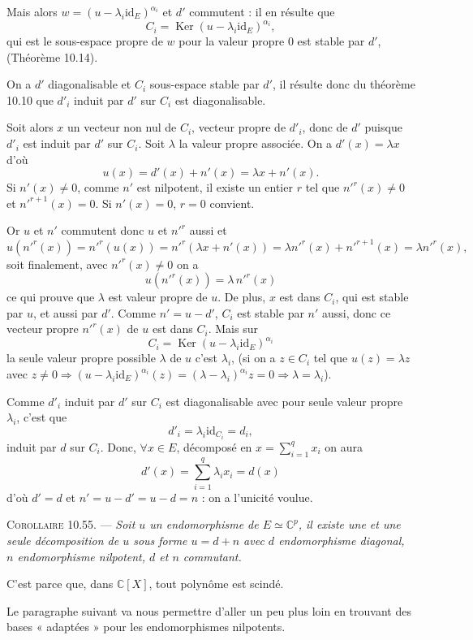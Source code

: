 Mais alors $w=(u-\lambda_i\mathrm{id}_E)^{\alpha_i}$ et $d'$ commutent : il en résulte que
\[
C_i=\operatorname{Ker}(u-\lambda_i\mathrm{id}_E)^{\alpha_i},
\]
qui est le sous-espace propre de $w$ pour la valeur propre 0 est stable par $d'$, (Théorème 10.14).

On a $d'$ diagonalisable et $C_i$ sous-espace stable par $d'$, il résulte donc du théorème 10.10 que $d'_i$ induit par $d'$ sur $C_i$ est diagonalisable.

Soit alors $x$ un vecteur non nul de $C_i$, vecteur propre de $d'_i$, donc de $d'$ puisque $d'_i$ est induit par $d'$ sur $C_i$. Soit $\lambda$ la valeur propre associée.
On a $d'(x)=\lambda x$ d'où
\[
u(x)=d'(x)+n'(x)=\lambda x+n'(x).
\]
Si $n'(x)\ne0$, comme $n'$ est nilpotent, il existe un entier $r$ tel que $n'^r(x)\ne0$ et $n'^{r+1}(x)=0$. Si $n'(x)=0$, $r=0$ convient.

Or $u$ et $n'$ commutent donc $u$ et $n'^r$ aussi et
\[
u(n'^r(x))=n'^r(u(x))=n'^r(\lambda x+n'(x))
=\lambda n'^r(x)+n'^{r+1}(x)=\lambda n'^r(x),
\]
soit finalement, avec $n'^r(x)\ne0$ on a
\[
u(n'^r(x))=\lambda\,n'^r(x)
\]
ce qui prouve que $\lambda$ est valeur propre de $u$. De plus, $x$ est dans $C_i$, qui est stable par $u$, et aussi par $d'$. Comme $n'=u-d'$, $C_i$ est stable par $n'$ aussi, donc ce vecteur propre $n'^r(x)$ de $u$ est dans $C_i$. Mais sur
\[
C_i=\operatorname{Ker}(u-\lambda_i\mathrm{id}_E)^{\alpha_i}
\]
la seule valeur propre possible $\lambda$ de $u$ c'est $\lambda_i$, (si on a $z\in C_i$ tel que $u(z)=\lambda z$ avec $z\ne0\Rightarrow (u-\lambda_i\mathrm{id}_E)^{\alpha_i}(z)=(\lambda-\lambda_i)^{\alpha_i}z=0\Rightarrow\lambda=\lambda_i$).

Comme $d'_i$ induit par $d'$ sur $C_i$ est diagonalisable avec pour seule valeur propre $\lambda_i$, c'est que
\[
d'_i=\lambda_i\mathrm{id}_{C_i}=d_i,
\]
induit par $d$ sur $C_i$.
Donc, $\forall x\in E$, décomposé en $x=\sum_{i=1}^q x_i$ on aura
\[
d'(x)=\sum_{i=1}^q\lambda_i x_i=d(x)
\]
d'où $d'=d$ et $n'=u-d'=u-d=n$ : on a l'unicité voulue. \bookend

\medskip\noindent\textsc{Corollaire 10.55.} --- \emph{Soit $u$ un endomorphisme de $E\simeq\mathbb C^p$, il existe une et une seule décomposition de $u$ sous forme $u=d+n$ avec $d$ endomorphisme diagonal, $n$ endomorphisme nilpotent, $d$ et $n$ commutant.}

C'est parce que, dans $\mathbb C[X]$, tout polynôme est scindé. \bookend

Le paragraphe suivant va nous permettre d'aller un peu plus loin en trouvant des bases « adaptées » pour les endomorphismes nilpotents.

